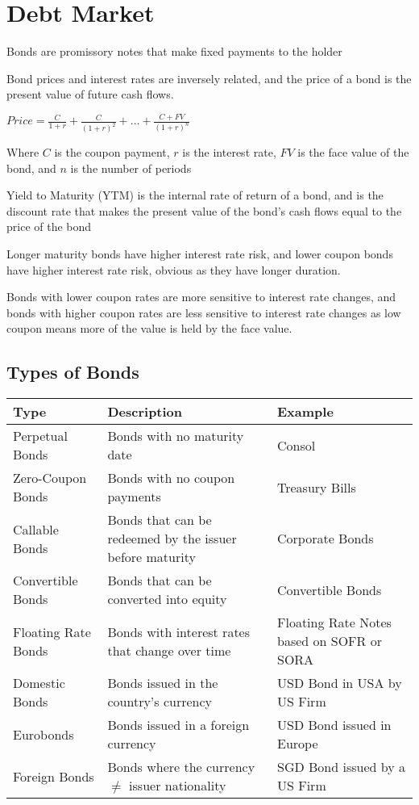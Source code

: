 \section{Debt Market}
Bonds are promissory notes that make fixed payments to the holder

Bond prices and interest rates are inversely related, and the price of a bond is the present value of future cash flows.

$Price = \frac{C}{1+r} + \frac{C}{(1+r)^2} + \ldots + \frac{C + FV}{(1+r)^n}$

Where $C$ is the coupon payment, $r$ is the interest rate, $FV$ is the face value of the bond, and $n$ is the number of periods

Yield to Maturity (YTM) is the internal rate of return of a bond, and is the discount rate that makes the present value of the bond's cash flows equal to the price of the bond

Longer maturity bonds have higher interest rate risk, and lower coupon bonds have higher interest rate risk, obvious as they have longer duration.

Bonds with lower coupon rates are more sensitive to interest rate changes, and bonds with higher coupon rates are less sensitive to interest rate changes as low coupon means more of the value is held by the face value.

\subsection{Types of Bonds}

\begin{tabularx}{\linewidth}{X X X}
\toprule
\textbf{Type} & \textbf{Description} & \textbf{Example} \\
\midrule
Perpetual Bonds & Bonds with no maturity date & Consol \\
\midrule
Zero-Coupon Bonds & Bonds with no coupon payments & Treasury Bills \\

\midrule
Callable Bonds & Bonds that can be redeemed by the issuer before maturity & Corporate Bonds \\
\midrule
Convertible Bonds & Bonds that can be converted into equity & Convertible Bonds \\
\midrule
Floating Rate Bonds & Bonds with interest rates that change over time & Floating Rate Notes based on SOFR or SORA \\
\midrule
Domestic Bonds & Bonds issued in the country's currency & USD Bond in USA by US Firm \\
\midrule
Eurobonds & Bonds issued in a foreign currency & USD Bond issued in Europe \\
\midrule
Foreign Bonds & Bonds where the currency $\neq$ issuer nationality & SGD Bond issued by a US Firm \\

\bottomrule
\end{tabularx}


